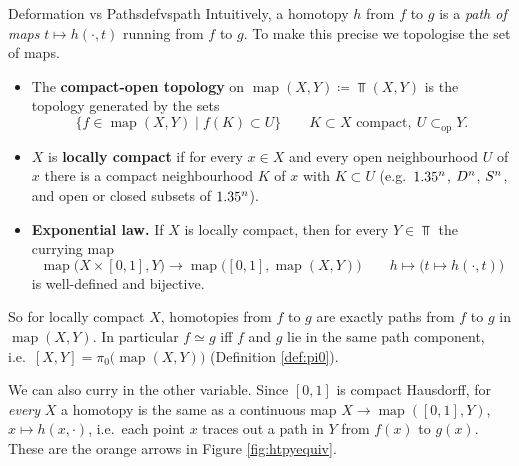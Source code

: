 \begin{remark}{Deformation vs Paths}{defvspath}
  Intuitively, a homotopy $h$ from $f$ to $g$ is a \emph{path of maps} $t\mapsto h(\cdot,t)$ running from $f$ to $g$. To make this precise we topologise the set of maps.
  \begin{itemize}
    \item The \textbf{compact-open topology} on $\operatorname{map}(X,Y)\coloneqq\Top(X,Y)$ is the topology generated by the sets \[
    \{f\in\operatorname{map}(X,Y)\mid f(K)\subset U\}\qquad K\subset X \text{ compact},\ U\subset_{\text{op}}Y.
    \]
    \item $X$ is \textbf{locally compact} if for every $x\in X$ and every open neighbourhood $U$ of $x$ there is a compact neighbourhood $K$ of $x$ with $K\subset U$ (e.g.\ $1.35^n$, $D^{n}$, $S^{n}$, and open or closed subsets of $1.35^n$).
    \item \textbf{Exponential law.} If $X$ is locally compact, then for every $Y\in\Top$ the currying map \[
    \operatorname{map}\big(X\times[0,1],Y\big)\to\operatorname{map}\big([0,1],\operatorname{map}(X,Y)\big)\qquad h\mapsto\big(t\mapsto h(\cdot,t)\big)
    \]
    is well-defined and bijective.
  \end{itemize}
  So for locally compact $X$, homotopies from $f$ to $g$ are exactly paths from $f$ to $g$ in $\operatorname{map}(X,Y)$. In particular $f\simeq g$ iff $f$ and $g$ lie in the same path component, i.e.\ $[X,Y]=\pi_0\big(\operatorname{map}(X,Y)\big)$ (Definition \ref{def:pi0}).

  We can also curry in the other variable. Since $[0,1]$ is compact Hausdorff, for \emph{every} $X$ a homotopy is the same as a continuous map $X\to\operatorname{map}([0,1],Y)$, $x\mapsto h(x,\cdot)$, i.e.\ each point $x$ traces out a path in $Y$ from $f(x)$ to $g(x)$. These are the orange arrows in Figure \ref{fig:htpyequiv}.
\end{remark}

